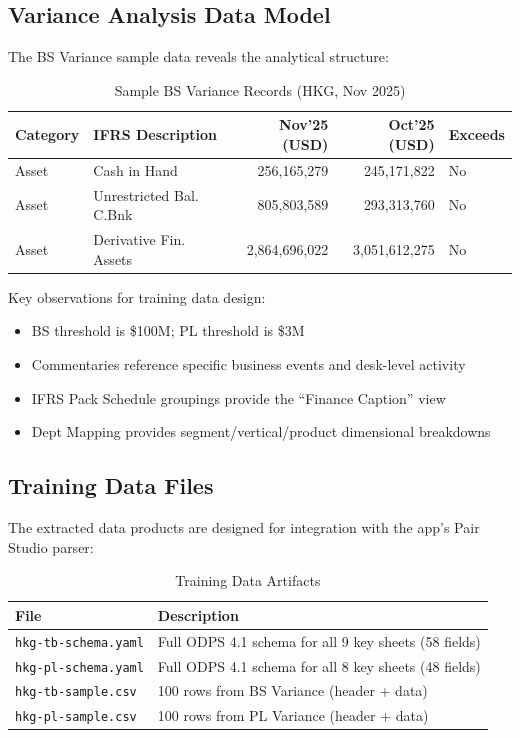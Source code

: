 \documentclass[11pt,a4paper]{article}
\begin{document}
\subsection{Variance Analysis Data Model}

The BS Variance sample data reveals the analytical structure:

\begin{table}[H]
\centering
\caption{Sample BS Variance Records (HKG, Nov 2025)}
\small
\begin{tabularx}{\textwidth}{lXrrl}
\toprule
\textbf{Category} & \textbf{IFRS Description} & \textbf{Nov'25 (USD)} & \textbf{Oct'25 (USD)} & \textbf{Exceeds} \\
\midrule
Asset & Cash in Hand            & 256,165,279 & 245,171,822 & No \\
Asset & Unrestricted Bal. C.Bnk & 805,803,589 & 293,313,760 & No \\
Asset & Derivative Fin. Assets  & 2,864,696,022 & 3,051,612,275 & No \\
\bottomrule
\end{tabularx}
\end{table}

\noindent Key observations for training data design:
\begin{itemize}[nosep]
    \item BS threshold is \$100M; PL threshold is \$3M
    \item Commentaries reference specific business events and desk-level activity
    \item IFRS Pack Schedule groupings provide the ``Finance Caption'' view
    \item Dept Mapping provides segment/vertical/product dimensional breakdowns
\end{itemize}

\subsection{Training Data Files}

The extracted data products are designed for integration with the app's Pair Studio parser:

\begin{table}[H]
\centering
\caption{Training Data Artifacts}
\begin{tabularx}{\textwidth}{lX}
\toprule
\textbf{File} & \textbf{Description} \\
\midrule
\texttt{hkg-tb-schema.yaml} & Full ODPS 4.1 schema for all 9 key sheets (58 fields) \\
\texttt{hkg-pl-schema.yaml} & Full ODPS 4.1 schema for all 8 key sheets (48 fields) \\
\texttt{hkg-tb-sample.csv} & 100 rows from BS Variance (header + data) \\
\texttt{hkg-pl-sample.csv} & 100 rows from PL Variance (header + data) \\
\bottomrule
\end{tabularx}
\end{table}
\end{document}
